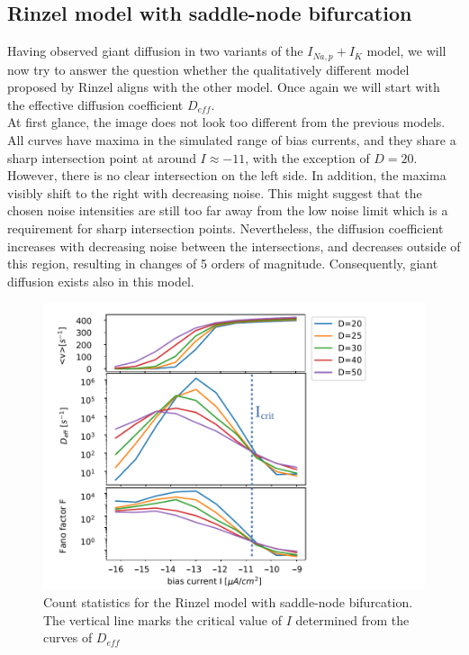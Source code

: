 \documentclass[12pt,a4paper]{article}
\begin{document}
\subsection{Rinzel model with saddle-node bifurcation}\label{rinzelmodel}
Having observed giant diffusion in two variants of the $I_{Na,p}+I_K$ model, we will now try to answer the question whether the qualitatively different model proposed by Rinzel aligns with the other model. Once again we will start with the effective diffusion coefficient $D_{eff}$.\\
At first glance, the image does not look too different from the previous models. All curves have maxima in the simulated range of bias currents, and they share a sharp intersection point at around $I\approx-11$, with the exception of $D=20$. However, there is no clear intersection on the left side. In addition, the maxima visibly shift to the right with decreasing noise. This might suggest that the chosen noise intensities are still too far away from the low noise limit which is a requirement for sharp intersection points. Nevertheless, the diffusion coefficient increases with decreasing noise between the intersections, and decreases outside of this region, resulting in changes of 5 orders of magnitude. Consequently, giant diffusion exists also in this model.
\begin{figure}[H]
	\centering
	\includegraphics[scale=1]{allfastrinzel2.pdf}\caption{Count statistics for the Rinzel model with saddle-node bifurcation. The vertical line marks the critical value of $I$ determined from the curves of $D_{eff}$}
	\label{allrinzel}
\end{figure}
\end{document}
